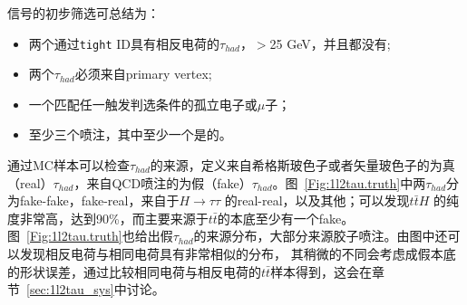 信号的初步筛选可总结为：
\begin{itemize}
  \item 两个通过\texttt{tight} ID具有相反电荷的$\tau_{had}$，\pt$>$25 GeV，并且都没有\btagged;
  \item 两个$\tau_{had}$必须来自primary vertex;
  \item 一个匹配任一触发判选条件的孤立电子或$\mu$子；
  \item 至少三个喷注，其中至少一个是\btagged 的。
\end{itemize}
通过MC样本可以检查$\tau_{had}$的来源，定义来自希格斯玻色子或者矢量玻色子的为真（real）$\tau_{had}$，来自QCD喷注的为假（fake）$\tau_{had}$。图~\ref{Fig:1l2tau.truth}中两$\tau_{had}$分为fake-fake，fake-real，来自于$H\rightarrow \tau\tau$
的real-real，以及其他；可以发现$t \bar t H$ 的纯度非常高，达到90\%，而主要来源于$t\bar{t}$的本底至少有一个fake。
图~\ref{Fig:1l2tau.truth}也给出假$\tau_{had}$的来源分布，大部分来源胶子喷注。由图中还可以发现相反电荷与相同电荷具有非常相似的分布，
其稍微的不同会考虑成假本底的形状误差，通过比较相同电荷与相反电荷的$t\bar{t}$样本得到，这会在章节~\ref{sec:1l2tau_sys}中讨论。
